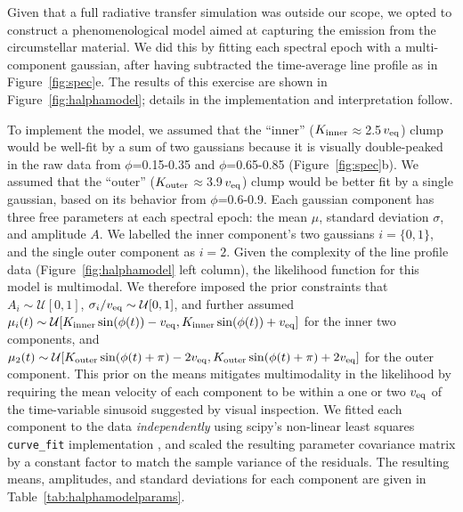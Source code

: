 \documentclass[11pt,twocolumn,tighten,linenumbers]{aastex7}
\begin{document}
Given that a full radiative transfer simulation was outside our scope,
we opted to construct a phenomenological model aimed at capturing the
emission from the circumstellar material.  We did this by fitting each
spectral epoch with a multi-component gaussian, after having
subtracted the time-average line profile as in Figure~\ref{fig:spec}e.
The results of this exercise are shown in
Figure~\ref{fig:halphamodel}; details in the implementation and
interpretation follow.

To implement the model, we assumed that the ``inner'' ($K_{\rm
inner}$$\approx$2.5\,$v_{\rm eq}$) clump would be well-fit by a sum of
two gaussians because it is visually double-peaked in the raw data
from $\phi$=0.15-0.35 and $\phi$=0.65-0.85 (Figure~\ref{fig:spec}b).
We assumed that the ``outer'' ($K_{\rm outer}$$\approx$3.9\,$v_{\rm
eq}$) clump would be better fit by a single gaussian, based on its
behavior from $\phi$=0.6-0.9.  Each gaussian component has three free
parameters at each spectral epoch: the mean $\mu$, standard deviation
$\sigma$, and amplitude $A$.  We labelled the inner component's two
gaussians $i=\{ 0, 1 \}$, and the single outer component as $i=2$.
Given the complexity of the line profile data
(Figure~\ref{fig:halphamodel} left column), the likelihood function
for this model is multimodal.  We therefore imposed the prior
constraints that $A_i \sim \mathcal{U}[0,1]$,
$\sigma_i/v_{\rm eq} \sim \mathcal{U}[0,1]$, and further assumed
$\mu_i(t) \sim
\mathcal{U}[
  K_{\rm inner}\sin(\phi(t)) - v_{\rm eq},
  K_{\rm inner}\sin(\phi(t)) + v_{\rm eq}
]$
for the inner two components, and
$\mu_2(t) \sim
\mathcal{U}[
  K_{\rm outer}\sin(\phi(t) + \pi) - 2v_{\rm eq},
  K_{\rm outer}\sin(\phi(t) + \pi) + 2v_{\rm eq}
]$
for the outer component.  This prior on the means mitigates
multimodality in the likelihood by requiring the mean velocity of each
component to be within a one or two $v_{\rm eq}$ of the time-variable
sinusoid suggested by visual inspection.  We fitted each component to
the data {\it independently} using scipy's non-linear least squares
\texttt{curve\_fit} implementation \citep{Virtanen2020}, and scaled the
resulting parameter covariance matrix by a constant factor to match
the sample variance of the residuals.  The resulting means,
amplitudes, and standard deviations for each component are given in
Table~\ref{tab:halphamodelparams}.
\end{document}
